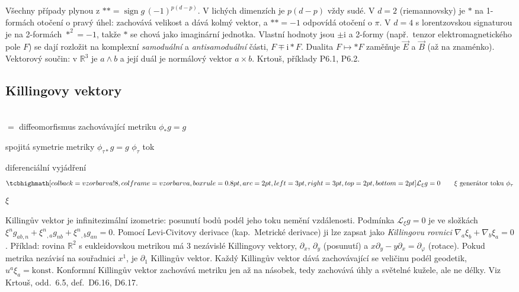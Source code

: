 \begin{vysvetleni}[K příkladům]
Všechny případy plynou z $**=\operatorname{sign}g\,(-1)^{p(d-p)}$. V lichých dimenzích je $p(d-p)$ vždy sudé. V $d=2$ (riemannovsky) je $*$ na 1-formách otočení o pravý úhel: zachovává velikost a dává kolmý vektor, a $**=-1$ odpovídá otočení o $\pi$.
V $d=4$ s lorentzovskou signaturou je na 2-formách $*^2=-1$, takže $*$ se chová jako imaginární jednotka. Vlastní hodnoty jsou $\pm\mathrm{i}$ a 2-formy (např.\ tenzor elektromagnetického pole $F$) se dají rozložit na komplexní \emph{samoduální} a \emph{antisamoduální} části, $F\mp\mathrm{i}*F$. Dualita $F\mapsto*F$ zaměňuje $\vec E$ a $\vec B$ (až na znaménko).
Vektorový součin: v $\mathbb{R}^3$ je $a\wedge b$  a její duál je normálový vektor $a\times b$. Krtouš, příklady P6.1, P6.2.
\end{vysvetleni}

\subsection{Killingovy vektory} 

 \\
\quad $=$ diffeomorfismus zachovávající metriku \quad $\phi_*g = g$

spojitá symetrie metriky \quad $\phi_{\tau*}g = g$ \qquad $\phi_\tau$ tok

\begin{definice}
diferenciální vyjádření
\[
  \vzorec{\mathcal{L}_\xi g = 0} \qquad \xi \text{ generátor toku } \phi_\tau
\]
$\xi$ \ 
\end{definice}

\begin{vysvetleni}
Killingův vektor je infinitezimální izometrie: posunutí bodů podél jeho toku nemění vzdálenosti. Podmínka $\mathcal{L}_\xi g=0$ je ve složkách $\xi^ng_{ab,n}+\xi^n{}_{,a}g_{nb}+\xi^n{}_{,b}g_{an}=0$. Pomocí Levi-Civitovy derivace (kap.\ Metrické derivace) ji lze zapsat jako \emph{Killingovu rovnici} $\nabla_a\xi_b+\nabla_b\xi_a=0$.
Příklad: rovina $\mathbb{R}^2$ s eukleidovskou metrikou má 3 nezávislé Killingovy vektory, $\partial_x$, $\partial_y$ (posunutí) a $x\partial_y-y\partial_x=\partial_\varphi$ (rotace). Pokud metrika nezávisí na souřadnici $x^1$, je $\partial_1$ Killingův vektor. Každý Killingův vektor dává zachovávající se veličinu podél geodetik, $u^a\xi_a=\text{konst}$.
Konformní Killingův vektor zachovává metriku jen až na násobek, tedy zachovává úhly a světelné kužele, ale ne délky.
Viz Krtouš, odd.~6.5, def.~D6.16, D6.17.
\end{vysvetleni}

